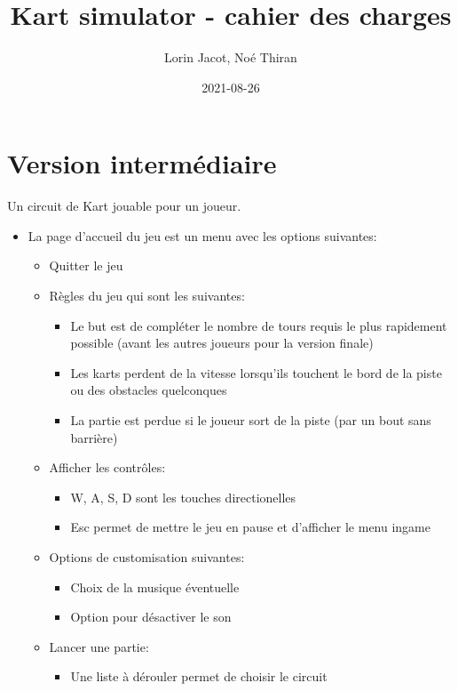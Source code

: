 \documentclass{article}
\title{Kart simulator - cahier des charges}
\date{2021-08-26}
\author{Lorin Jacot, Noé Thiran}
\begin{document}
\maketitle

\section{Version intermédiaire}

Un circuit de Kart jouable pour un joueur.
\begin{itemize}
    \item La page d'accueil du jeu est un menu avec les options suivantes: \begin{itemize}
              \item Quitter le jeu
              \item Règles du jeu qui sont les suivantes: \begin{itemize}
                        \item Le but est de compléter le nombre de tours requis le plus rapidement possible (avant les autres joueurs pour la version finale)
                        \item Les karts perdent de la vitesse lorsqu'ils touchent le bord de la piste ou des obstacles quelconques
                        \item La partie est perdue si le joueur sort de la piste (par un bout sans barrière)
                    \end{itemize}
              \item Afficher les contrôles: \begin{itemize}
                        \item W, A, S, D sont les touches directionelles
                        \item Esc permet de mettre le jeu en pause et d'afficher le menu ingame
                    \end{itemize}
              \item Options de customisation suivantes: \begin{itemize}
                        \item Choix de la musique éventuelle
                        \item Option pour désactiver le son
                    \end{itemize}
              \item Lancer une partie: \begin{itemize}
                        \item Une liste à dérouler permet de choisir le circuit

\end{itemize}
\end{itemize}
\end{itemize}
\end{document}
